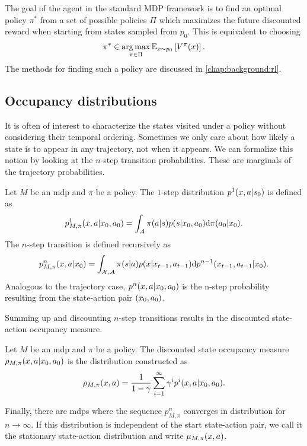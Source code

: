 The goal of the agent in the standard MDP framework is to find an optimal policy $\pi^*$ from a set of possible policies $\Pi$ which maximizes the future discounted reward when starting from states sampled from $p_0$.
This is equivalent to choosing $$\pi^* \in \operatorname*{arg\,max}_{\pi \in \Pi} \mathbb{E}_{x \sim p_0}\left[V^\pi(x)\right].$$
The methods for finding such a policy are discussed in \autoref{chap:background:rl}.

\subsection{Occupancy distributions}

It is often of interest to characterize the states visited under a policy without considering their temporal ordering.
Sometimes we only care about how likely a state is to appear in any trajectory, not when it appears.
We can formalize this notion by looking at the $n$-step transition probabilities.
These are marginals of the trajectory probabilities.

\begin{definition}
    Let $M$ be an \ac{mdp} and $\pi$ be a policy.
    The $1$-step distribution $p^1(x,a|s_0)$ is defined as $$p^1_{M, \pi}(x,a|x_0,a_0) = \int_{\mathcal{A}} \pi(a|s) p(s|x_0,a_0) \mathrm{d} \pi(a_0|x_0).$$ 
    The $n$-step transition is defined recursively as $$p^n_{M, \pi}(x,a|x_0) = \int_{\mathcal{X},\mathcal{A}} \pi(s|a) p(x|x_{t-1},a_{t-1}) \mathrm{d} p^{n-1}(x_{t-1},a_{t-1}|x_0) .$$
    Analogous to the trajectory case, $p^n(x,a|x_0,a_0)$ is the n-step probability resulting from the state-action pair $(x_0,a_0)$.
\end{definition}

Summing up and discounting $n$-step transitions results in the discounted state-action occupancy measure.

\begin{definition}
    Let $M$ be an \ac{mdp} and $\pi$ be a policy.
    The discounted state occupancy measure $\rho_{M,\pi}(x,a|x_0,a_0)$ is the distribution constructed as $$\rho_{M,\pi}(x,a) = \frac{1}{1 - \gamma} \sum_{i=1}^\infty \gamma^i p^i(x,a|x_0,a_0).$$
\end{definition}

Finally, there are \acp{mdp} where the sequence $p^n_{M,\pi}$ converges in distribution for $n \rightarrow \infty$.
If this distribution is independent of the start state-action pair, we call it the stationary state-action distribution and write $\mu_{M,\pi}(x,a)$.

